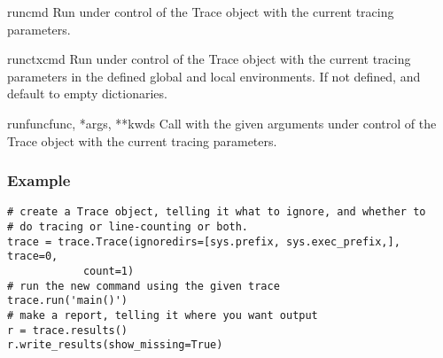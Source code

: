 \begin{methoddesc}[Trace]{run}{cmd}
Run  under control of the Trace object with the current tracing
parameters.
\end{methoddesc}

\begin{methoddesc}[Trace]{runctx}{cmd}
Run  under control of the Trace object with the current tracing
parameters in the defined global and local environments.  If not defined,
 and  default to empty dictionaries.
\end{methoddesc}

\begin{methoddesc}[Trace]{runfunc}{func, *args, **kwds}
Call  with the given arguments under control of the Trace
object with the current tracing parameters.
\end{methoddesc}

\subsubsection{Example}

\begin{verbatim}
# create a Trace object, telling it what to ignore, and whether to
# do tracing or line-counting or both.
trace = trace.Trace(ignoredirs=[sys.prefix, sys.exec_prefix,], trace=0,
		    count=1)
# run the new command using the given trace
trace.run('main()')
# make a report, telling it where you want output
r = trace.results()
r.write_results(show_missing=True)
\end{verbatim}
